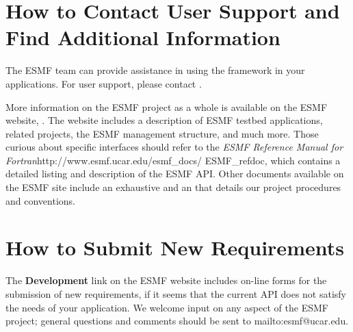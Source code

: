 \section{How to Contact User Support and Find Additional Information}
\label{sec:Support}
The ESMF team can provide assistance in using the framework in your
applications.
For user support, please contact 
.  

More information on the ESMF project as a whole is available on the 
ESMF website, .  
The website includes a description of ESMF testbed applications, related projects,
the ESMF management structure, and much more.  Those curious about specific 
interfaces should refer to the \htmladdnormallink
{{\it ESMF Reference Manual for Fortran}}{http://www.esmf.ucar.edu/esmf_docs/
ESMF_refdoc}, which contains a detailed listing and description of 
the ESMF API.  Other documents available on the ESMF site include an exhaustive
and an  
that details our project procedures and conventions.

\section{How to Submit New Requirements}
\label{sec:Submission}
The {\bf Development} 
link on the ESMF website includes on-line forms for the submission of 
new requirements, if it seems that the current API does not satisfy the needs of 
your application.  We welcome input on any aspect of the ESMF project; general
questions and comments should be sent to 
{mailto:esmf@ucar.edu}.


